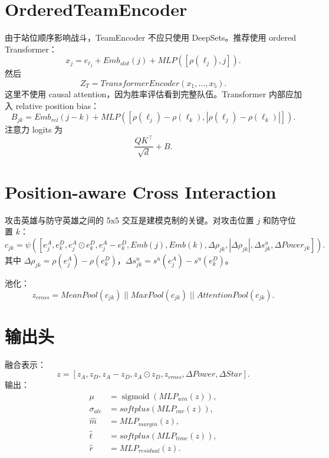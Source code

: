 \documentclass[UTF8,12pt,openany]{ctexbook}
\newcommand{\sigmoid}{\operatorname{sigmoid}}
\begin{document}
\section{OrderedTeamEncoder}
由于站位顺序影响战斗，TeamEncoder 不应只使用 DeepSets。推荐使用 ordered Transformer：
\begin{equation}
x_{j}=e_{\ell_j}+Emb_{slot}(j)+MLP([\rho(\ell_j),j]).
\end{equation}
然后
\begin{equation}
Z_T=TransformerEncoder(x_1,\ldots,x_5).
\end{equation}
这里不使用 causal attention，因为胜率评估看到完整队伍。Transformer 内部应加入 relative position bias：
\begin{equation}
B_{jk}=Emb_{rel}(j-k)+MLP([\rho(\ell_j)-\rho(\ell_k),|\rho(\ell_j)-\rho(\ell_k)|]).
\end{equation}
注意力 logits 为
\begin{equation}
\frac{QK^\top}{\sqrt d}+B.
\end{equation}

\section{Position-aware Cross Interaction}
攻击英雄与防守英雄之间的 5x5 交互是建模克制的关键。对攻击位置 $j$ 和防守位置 $k$：
\begin{equation}
c_{jk}=\psi([e^A_j,e^D_k,e^A_j\odot e^D_k,e^A_j-e^D_k,Emb(j),Emb(k),\Delta\rho_{jk},|\Delta\rho_{jk}|,\Delta s^u_{jk},\Delta Power_{jk}]).
\end{equation}
其中 $\Delta\rho_{jk}=\rho(e^A_j)-\rho(e^D_k)$，$\Delta s^u_{jk}=s^u(e^A_j)-s^u(e^D_k)$。

池化：
\begin{equation}
z_{cross}=MeanPool(c_{jk})\;||\;MaxPool(c_{jk})\;||\;AttentionPool(c_{jk}).
\end{equation}

\section{输出头}
融合表示：
\begin{equation}
z=[z_A,z_D,z_A-z_D,z_A\odot z_D,z_{cross},\Delta Power,\Delta Star].
\end{equation}
输出：
\begin{align}
\mu&=\sigmoid(MLP_{win}(z)),\\
\sigma_{ale}&=softplus(MLP_{var}(z)),\\
\hat m&=MLP_{margin}(z),\\
\hat t&=softplus(MLP_{time}(z)),\\
\hat r&=MLP_{residual}(z).
\end{align}
\end{document}
